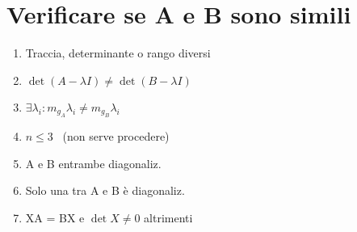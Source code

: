 \section{Verificare se A e B sono simili}
\begin{enumerate}[noitemsep]
	\item Traccia, determinante o rango diversi \xmark
	\item $\det(A-\lambda I) \ne \det(B-\lambda I)$ \xmark
	\item $\exists \lambda_i: m_{g_A} \lambda_i \ne m_{g_B} \lambda_i$ \xmark
	\item $n \le 3$ \cmark\ (non serve procedere)
	\item A e B entrambe diagonaliz. \cmark
	\item Solo una tra A e B è diagonaliz. \xmark
	\item XA = BX e $\det X \ne 0$ \cmark altrimenti \xmark
\end{enumerate}
